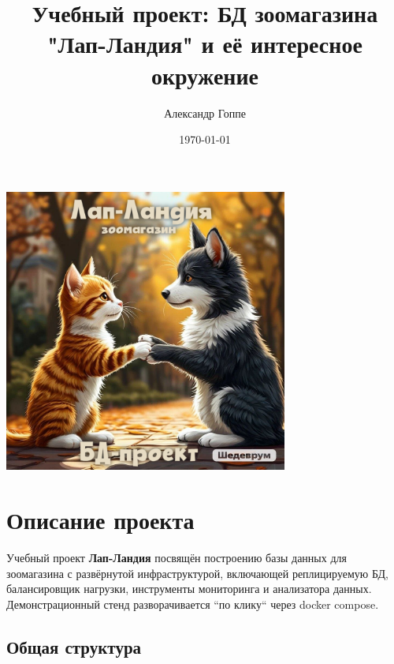 \documentclass[a4paper,12pt]{article}
\title{Учебный проект: БД зоомагазина "Лап-Ландия" и её интересное окружение}
\author{Александр Гоппе}
\date{}
\begin{document}
    \maketitle

    \begin{center}
        \includegraphics[width=0.7\textwidth]{title_good.jpg} %
    \end{center}

    \vfill
    \begin{center}
        \date{\today}
    \end{center}
    \newpage

    \tableofcontents
    \newpage


    \section{Описание проекта}


    \indent
    Учебный проект \textbf{Лап-Ландия} посвящён построению базы данных для зоомагазина с развёрнутой инфраструктурой,
    включающей реплицируемую БД, балансировщик нагрузки,
    инструменты мониторинга и анализатора данных.
    Демонстрационный стенд разворачивается ``по клику`` через docker compose.

    \subsection{Общая структура}
\end{document}
